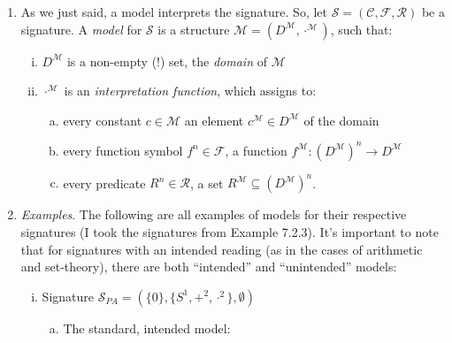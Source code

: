 	\begin{enumerate}[\thesection.1]

		\item As we just said, a model interprets the signature. So, let $\mathcal{S}=(\mathcal{C}, \mathcal{F}, \mathcal{R})$ be a signature. A \emph{model} for $\mathcal{S}$ is a structure $\mathcal{M}=(D^\mathcal{M},\cdot^\mathcal{M})$, such that:
		\begin{enumerate}[(i)]
		
			\item $D^\mathcal{M}$ is a non-empty (!) set, the \emph{domain} of $\mathcal{M}$
			
			\item $\cdot^\mathcal{M}$ is an \emph{interpretation function}, which assigns to:
			\begin{enumerate}[(a)]
			
				\item every constant $c\in\mathcal{M}$ an element $c^\mathcal{M}\in D^\mathcal{M}$ of the domain
				
			  \item every function symbol $f^n\in\mathcal{F}$,
				a function $f^\mathcal{M}:(D^{\mathcal{M}})^n\to D^{\mathcal{M}}$
				
			  \item every predicate $R^n\in\mathcal{R}$, a set
				$R^\mathcal{M}\subseteq (D^{\mathcal{M}})^n$.
			
			\end{enumerate}
					
		\end{enumerate}
		
		\item \emph{Examples}. The following are all examples of models for their respective signatures (I took the signatures from Example 7.2.3). It's important to note that for signatures with an intended reading (as in the cases of arithmetic and set-theory), there are both ``intended'' and ``unintended'' models:
		
			\begin{enumerate}[(i)]
			
					
				\item Signature $\mathcal{S}_{PA}=(\{0\}, \{S^1, +^2, \cdot^2\}, \emptyset)$
				
				\begin{enumerate}[(a)]
				
					\item The standard, intended model:
					

\end{enumerate}
\end{enumerate}
\end{enumerate}
